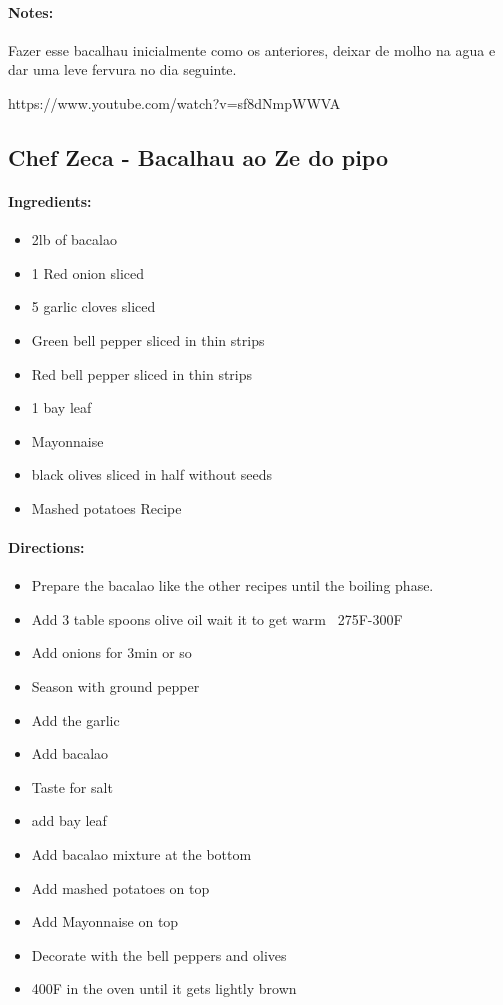 \documentclass{article}
\begin{document}
\paragraph{Notes:}

Fazer esse bacalhau inicialmente como os anteriores, deixar de molho na agua e dar uma leve fervura no dia seguinte.

https://www.youtube.com/watch?v=sf8dNmpWWVA

\subsection{Chef Zeca - Bacalhau ao Ze do pipo}

\paragraph{Ingredients:}

\begin{itemize}
	\item 2lb of bacalao
	\item 1 Red onion sliced
	\item 5 garlic cloves sliced
	\item Green bell pepper sliced in thin strips
	\item Red bell pepper sliced in thin strips
	\item 1 bay leaf
	\item Mayonnaise
	\item black olives sliced in half without seeds
	\item Mashed potatoes Recipe
\end{itemize}

\paragraph{Directions:}
\begin{itemize}
	\item Prepare the bacalao like the other recipes until the boiling phase.
	\item Add 3 table spoons olive oil wait it to get warm ~275F-300F
	\item Add onions for 3min or so
	\item Season with ground pepper
	\item Add the garlic
	\item Add bacalao
	\item Taste for salt
	\item add bay leaf
	\item Add bacalao mixture at the bottom
	\item Add mashed potatoes on top
	\item Add Mayonnaise on top
	\item Decorate with the bell peppers and olives
	\item 400F in the oven until it gets lightly brown
\end{itemize}
\end{document}
